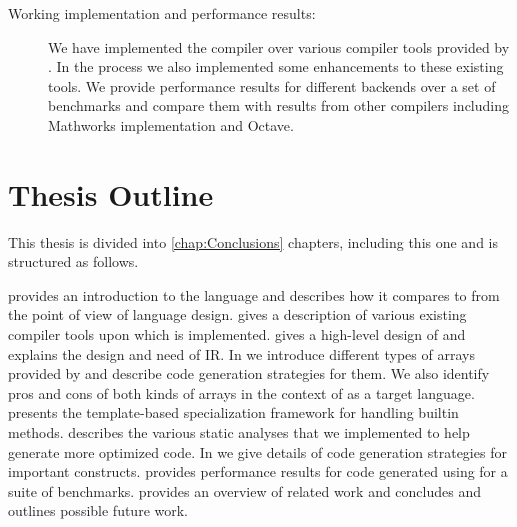 \begin{description}
\item[Working implementation and performance results:] We have implemented the 
\mixten compiler over various \matlab compiler tools provided by \mclab. In the
process we also implemented some enhancements to these existing tools.
We provide performance results for different \xten backends over a set 
of benchmarks and compare them with results from other \matlab compilers
including Mathworks \matlab implementation and Octave.

\end{description}

\section{Thesis Outline}

This thesis is divided into \ref{chap:Conclusions} chapters, including this one
and is structured as follows. 

 provides an introduction to the \xten language and describes
how it compares to \matlab from the point of view of language design.
 gives a description of various existing \matlab
compiler tools upon which \mixten is implemented. 
 gives a high-level design of \mixten and explains the
design and need of \mixten IR.
In  we introduce different types of arrays provided by
\xten and describe code generation strategies for them. We also identify pros
and cons of both kinds of arrays in the context of \xten as a target language.
 presents the template-based specialization framework for
handling \matlab builtin methods.
 describes the various static analyses that we
implemented to help generate more optimized code.
In  we give details of code generation strategies for
important \matlab constructs.
 provides performance results for code generated using
\mixten for a suite of benchmarks.
 provides an overview of related work and
 concludes and outlines possible future work.

